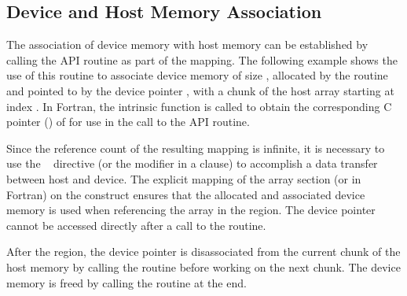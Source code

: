 \subsection{Device and Host Memory Association}
\label{subsec:target_associate_ptr}
\label{sec:target_associate_ptr}

The association of device memory with host memory
can be established by calling the  
API routine as part of the mapping.
The following example shows the use of this routine
to associate device memory of size , 
allocated by the  routine and
pointed to by the device pointer , 
with a chunk of the host array  starting at index .
In Fortran, the intrinsic function  is called
to obtain the corresponding C pointer () of  
for use in the call to the API routine.

Since the reference count of the resulting mapping is infinite,
it is necessary to use the ~ directive (or
the  modifier in a  clause) to accomplish a
data transfer between host and device.
The explicit mapping of the array section  
(or  in Fortran) on the 
construct ensures that the allocated and associated device memory is used 
when referencing the array  in the  region.
The device pointer  cannot be accessed directly 
after a call to the  routine.

After the  region, the device pointer is disassociated from
the current chunk of the host memory by calling the  routine before working on the next chunk.
The device memory is freed by calling the 
routine at the end.



